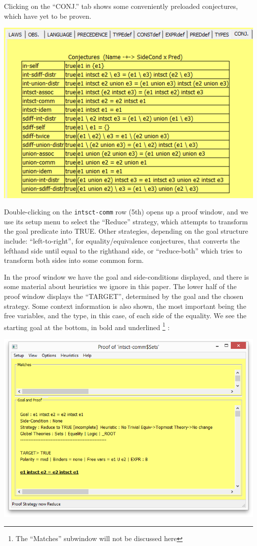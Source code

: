 \noindent
Clicking on the ``CONJ.'' tab shows some conveniently preloaded conjectures,
which have yet to be proven.

\includegraphics[scale=0.5]{03-set-conjectures.png}

\noindent
Double-clicking on the \texttt{intsct-comm} row (5th) opens up a proof window,
and we use its setup menu to select the ``Reduce'' strategy,
which attempts to transform the goal predicate into TRUE.
Other strategies, depending on the goal structure include: ``left-to-right'',
for equality/equivalence conjectures, that
converts the lefthand side until equal to the righthand side,
or ``reduce-both'' which tries to transform both sides into some common form.

In the proof window we have the goal and side-conditions displayed,
and there is some material about heuristics we ignore in this paper.
The lower half of the proof window displays the ``TARGET'',
determined by the goal and the chosen strategy.
Some context information is also shown, the most important being the free variables,
and the type, in this case, of each side of the equality.
We see the starting goal at the bottom, in bold and underlined%
\footnote{The ``Matches'' subwindow will not be discussed here}%
:

\includegraphics[scale=0.5]{06-starting-REDUCE-proof.png}

